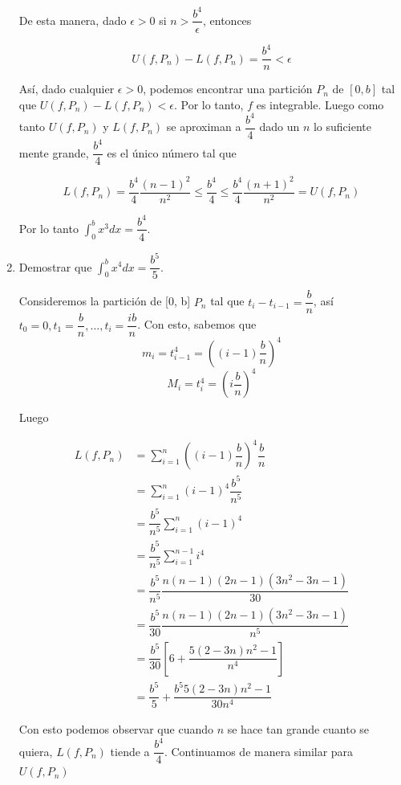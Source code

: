 \documentclass{report}
\begin{document}
\begin{enumerate}[label=\textcolor{NavyBlue}{\textbf{\arabic*.}}]
        De esta manera, dado $\epsilon > 0$ si $n > \dfrac{b^4}{\epsilon}$, entonces

        $$U(f, P_n) - L(f, P_n) = \dfrac{b^4}{n} < \epsilon$$

        Así, dado cualquier $\epsilon > 0$, podemos encontrar una partición $P_n$ de $[0,b]$ tal que $U(f, P_n) - L(f, P_n) < \epsilon$. Por lo tanto, $f$ es integrable. Luego como tanto $U(f, P_n)$ y $L(f, P_n)$ se aproximan a $\dfrac{b^4}{4}$ dado un $n$ lo suficiente mente grande, $\dfrac{b^4}{4}$ es el único número tal que

        $$L(f, P_n) = \dfrac{b^4}{4} \dfrac{(n-1)^2}{n^2} \leq \dfrac{b^4}{4} \leq \dfrac{b^4}{4} \dfrac{(n+1)^2}{n^2} = U(f, P_n)$$

        Por lo tanto $\int_{0}^{b} x^3 dx = \dfrac{b^4}{4}$.

        \item Demostrar que $\int_{0}^{b}x^4dx = \dfrac{b^5}{5}$.

        Consideremos la partición de [0, b] $P_n$ tal que $t_i - t_{i-1} = \dfrac{b}{n}$, así $t_0 = 0, t_1 = \dfrac{b}{n}, \dots , t_i =\dfrac{ib}{n}$. Con esto, sabemos que
        $$m_i = t_{i-1}^4 = \left((i-1)\dfrac{b}{n}\right)^4$$
        $$M_i = t_{i}^4 = \left(i\dfrac{b}{n}\right)^4$$

        Luego

        \begin{align*}
            L(f, P_n) &= \sum_{i=1}^{n}\left((i-1)\dfrac{b}{n}\right)^4\dfrac{b}{n}\\
            &= \sum_{i=1}^{n}(i-1)^4\dfrac{b^5}{n^5}\\
            &= \dfrac{b^5}{n^5} \sum_{i=1}^{n}(i-1)^4\\
            &= \dfrac{b^5}{n^5} \sum_{i=1}^{n-1}i^4\\
            &= \dfrac{b^5}{n^5} \dfrac{n(n-1)(2n-1)(3n^2-3n-1)}{30}\\
            &= \dfrac{b^5}{30} \dfrac{n(n-1)(2n-1)(3n^2-3n-1)}{n^5}\\
            &= \dfrac{b^5}{30} \left[6 + \dfrac{5(2-3n)n^2-1}{n^4}\right]\\
            &= \dfrac{b^5}{5} + \dfrac{b^5 5(2-3n)n^2-1}{30n^4}
        \end{align*}

        Con esto podemos observar que cuando $n$ se hace tan grande cuanto se quiera, $L(f, P_n)$ tiende a $\dfrac{b^4}{4}$. Continuamos de manera similar para $U(f, P_n)$


\end{enumerate}
\end{document}
